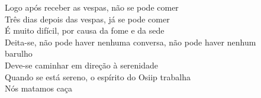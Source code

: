 \bigskip

\begin{linenumbers}
 
\noindent Logo após receber as vespas, não se pode comer\\
 Três dias depois das vespas, já se pode comer\\
 É muito difícil, por causa da fome e da sede\\
 Deita-se, não pode haver nenhuma conversa, não pode haver nenhum\\
 barulho\\
 Deve-se caminhar em direção à serenidade\\
 Quando se está sereno, o espírito do Osiip trabalha\\
 Nós matamos caça
 
\end{linenumbers}

\bigskip

